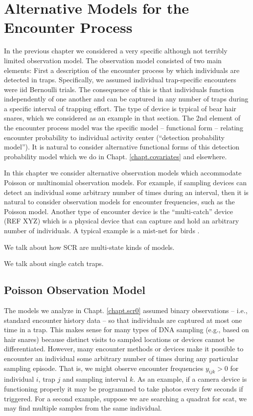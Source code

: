 ﻿\chapter{Alternative Models for the Encounter Process}
\label{chapt.poisson-mn}

In the previous chapter we considered a very specific although not
terribly limited observation model. The observation model consisted of
two main elements: First a description of the encounter process 
by which individuals are detected in traps. Specifically, we 
assumed individual trap-specific encounters were iid Bernoulli
trials. The consequence of this is that individuals function
independently of one another and can be captured in
any number of traps during a specific interval of trapping
effort. The type of device is typical of bear hair snares, which we
considered as an example in that section. The 2nd element of the
encounter process model was the specific model – functional form –
relating encounter probability to individual activity center
(``detection probability model'').  It is natural to consider
alternative functional forms of this detection probability model which
we do in Chapt. \ref{chapt.covariates} and elsewhere. 

In this chapter we consider alternative observation models which
accommodate Poisson or multinomial observation models. For example, if
sampling devices can detect an individual some arbitrary number of
times during an interval, then it is natural to consider observation
models for encounter frequencies, such as the Poisson model. Another
type of encounter device is the ``multi-catch'' device (REF XYZ) which
is a physical device that can capture and hold an arbitrary number of
individuals. A typical example is a mist-net for birds 
\citep{borchers_efford:2008}.

We talk about how SCR are multi-state kinds of models. 

We talk about single catch traps. 


\section{Poisson Observation Model}

The models we analyze in Chapt. \ref{chapt.scr0} assumed binary
observations -- i.e., standard encounter history data -- so
that individuals are captured at most one time in a trap.  This makes
sense for many types of DNA sampling (e.g., based on hair snares)
because distinct visits to sampled locations or devices cannot be
differentiated. However, many encounter methods or devices make it
possible to encounter an individual some arbitrary number of times
during any particular sampling episode. That is, we might observe
encounter frequencies $y_{ijk}>0$ for individual $i$, trap $j$ and
sampling interval $k$.  As an example, if a camera device is
functioning properly it may be programmed to take photos every few
seconds if triggered.  For a second example, suppose we are searching
a quadrat for scat, we may find multiple samples from the same
individual.

